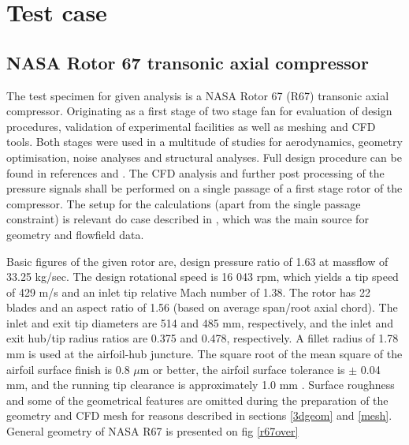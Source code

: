 
\chapter{Test case} %

\label{case} %


\section{NASA Rotor 67 transonic axial compressor}

The test specimen for given analysis is a NASA Rotor 67 (R67) transonic axial compressor. Originating as a first stage of two stage fan for evaluation of design procedures, validation of experimental facilities as well as meshing and CFD tools. Both stages were used in a multitude of studies for aerodynamics, geometry optimisation, noise analyses and structural analyses. Full design procedure can be found in references \cite{r67design} and \citep{r67performance}. The CFD analysis and further post processing of the pressure signals shall be performed on a single passage of a first stage rotor of the compressor. The setup for the  calculations (apart from the single passage constraint) is relevant do case described in \citep{r67laser}, which was the main source for geometry and flowfield data.

Basic figures of the given rotor are, design pressure ratio of 1.63 at massflow of 33.25 kg/sec. The design rotational speed is 16 043 rpm, which yields a tip speed of 429 m/s and an inlet tip relative Mach number of 1.38. The rotor has 22 blades and an aspect ratio of 1.56 (based on average span/root axial chord). The inlet and exit tip diameters are 514 and 485 mm, respectively, and the inlet and exit hub/tip radius ratios are 0.375 and 0.478, respectively. A fillet radius of 1.78 mm is used at the airfoil-hub juncture. The square root of the mean square of the airfoil surface finish is 0.8 $\mu${}m or better, the airfoil surface tolerance is $\pm$ 0.04 mm, and the running tip clearance is approximately 1.0 mm \citep{r67laser}. Surface roughness and some of the geometrical features are omitted during the preparation of the geometry and CFD mesh for reasons described in sections \ref{3dgeom} and \ref{mesh}. General geometry of NASA R67 is presented on fig \ref{r67over}

